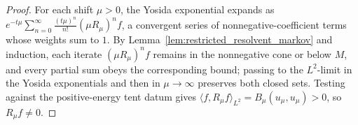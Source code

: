 \begin{proof}
\leanok
For each shift $\mu > 0$, the Yosida exponential expands as $e^{-t\mu} \sum_{n=0}^{\infty} \frac{(t\mu)^n}{n!} (\mu R_\mu)^n f$, a convergent series of nonnegative-coefficient terms whose weights sum to $1$. By Lemma~\ref{lem:restricted_resolvent_markov} and induction, each iterate $(\mu R_\mu)^n f$ remains in the nonnegative cone or below $M$, and every partial sum obeys the corresponding bound; passing to the $L^2$-limit in the Yosida exponentials and then in $\mu \to \infty$ preserves both closed sets. Testing against the positive-energy tent datum gives $\langle f, R_\mu f \rangle_{L^2} = B_\mu(u_\mu, u_\mu) > 0$, so $R_\mu f \ne 0$.
\end{proof}
